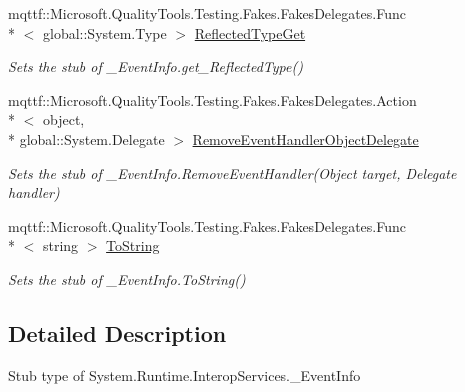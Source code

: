 \begin{DoxyCompactItemize}
mqttf\-::\-Microsoft.\-Quality\-Tools.\-Testing.\-Fakes.\-Fakes\-Delegates.\-Func\\*
$<$ global\-::\-System.\-Type $>$ \hyperlink{class_system_1_1_runtime_1_1_interop_services_1_1_fakes_1_1_stub___event_info_a35e691c6505c3964c896e2bb22aa57b4}{Reflected\-Type\-Get}
\begin{DoxyCompactList}\small\item\em Sets the stub of \-\_\-\-Event\-Info.\-get\-\_\-\-Reflected\-Type()\end{DoxyCompactList}\item 
mqttf\-::\-Microsoft.\-Quality\-Tools.\-Testing.\-Fakes.\-Fakes\-Delegates.\-Action\\*
$<$ object, \\*
global\-::\-System.\-Delegate $>$ \hyperlink{class_system_1_1_runtime_1_1_interop_services_1_1_fakes_1_1_stub___event_info_ab5cbc966ffa58d306139eb24d054e8d1}{Remove\-Event\-Handler\-Object\-Delegate}
\begin{DoxyCompactList}\small\item\em Sets the stub of \-\_\-\-Event\-Info.\-Remove\-Event\-Handler(\-Object target, Delegate handler)\end{DoxyCompactList}\item 
mqttf\-::\-Microsoft.\-Quality\-Tools.\-Testing.\-Fakes.\-Fakes\-Delegates.\-Func\\*
$<$ string $>$ \hyperlink{class_system_1_1_runtime_1_1_interop_services_1_1_fakes_1_1_stub___event_info_ad9775f774875fb093096538d180d3ec4}{To\-String}
\begin{DoxyCompactList}\small\item\em Sets the stub of \-\_\-\-Event\-Info.\-To\-String()\end{DoxyCompactList}\end{DoxyCompactItemize}


\subsection{Detailed Description}
Stub type of System.\-Runtime.\-Interop\-Services.\-\_\-\-Event\-Info



